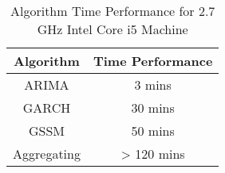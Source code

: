 \begin{table*}[h!]
\centering
\caption{Algorithm Time Performance for 2.7 GHz Intel Core i5 Machine}
    \label{table:algorithmperformance}
    \begin{tabular}{|c|c|}
        \hline
        Algorithm & Time Performance \\
        \hline
        \hline
		ARIMA & 3 mins \\
        \hline
		GARCH & 30 mins \\
        \hline
		GSSM & 50 mins \\
        \hline
		Aggregating & > 120 mins \\
        \hline
    \end{tabular}
\end{table*}